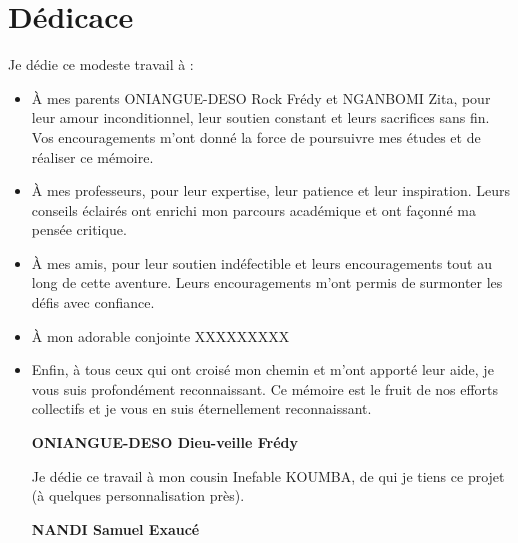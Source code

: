 \chapter*{Dédicace}
Je dédie ce modeste travail à :
\begin{itemize}
  \item {
    À mes parents ONIANGUE-DESO Rock Frédy et NGANBOMI Zita, pour leur amour
    inconditionnel, leur soutien constant et leurs sacrifices sans fin. Vos
    encouragements m’ont donné la force de poursuivre mes études et de réaliser ce mémoire.
  }
\item {
    À mes professeurs, pour leur expertise, leur patience et leur inspiration.
    Leurs conseils éclairés ont enrichi mon parcours académique et ont façonné ma pensée critique.

  }
\item {
    À mes amis, pour leur soutien indéfectible et leurs encouragements tout au
    long de cette aventure. Leurs encouragements m’ont permis de surmonter les défis avec confiance.

  }

\item {
    À mon adorable conjointe XXXXXXXXX

  }

  \item {
    Enfin, à tous ceux qui ont croisé mon chemin et m’ont apporté leur aide, je vous suis profondément reconnaissant. Ce mémoire est le fruit de nos efforts collectifs et je vous en suis éternellement reconnaissant.
  }

  \vspace{0.2cm}
  \begin{flushright}
    \large {
      \textbf {
        ONIANGUE-DESO Dieu-veille Frédy
      }
    }
  \end{flushright}

  \vspace{1.5cm}

  Je dédie ce travail à mon cousin  Inefable KOUMBA, de qui je tiens ce 	projet (à quelques personnalisation près).
  \vspace{0.2cm}
  \begin{flushright}
    \large {
      \textbf {
        NANDI Samuel Exaucé
    }
    }
  \end{flushright}

\end{itemize}

